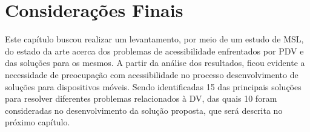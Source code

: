 \section{Considerações Finais}

Este capítulo buscou realizar um levantamento, por meio de um estudo de MSL, do estado da arte
acerca dos problemas de acessibilidade enfrentados por PDV e das soluções para os mesmos.
A partir da análise dos resultados, ficou evidente a necessidade de preocupação com
acessibilidade no processo desenvolvimento de soluções para dispositivos móveis.
Sendo identificadas 15 das principais soluções para resolver diferentes problemas relacionados à DV,
das quais 10 foram consideradas no desenvolvimento da solução proposta,
que será descrita no próximo capítulo.